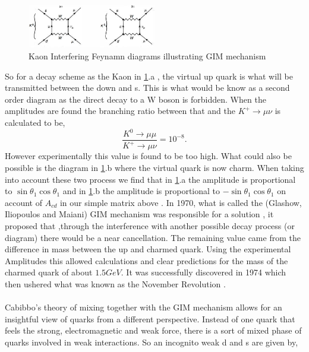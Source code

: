 \begin{figure}[h]
\centering
\includegraphics[width=0.5\textwidth]{figs/ckmfig3.jpg}
\caption{Kaon Interfering Feynamn diagrams illustrating GIM mechanism}
\label{fey2}
\end{figure}


So for a decay scheme as the Kaon in \cref{fey2}.a , the virtual up quark is what will be transmitted between the down and s. This is what would be know as a second order diagram as the direct decay to a W boson is forbidden. When the amplitudes are found the branching ratio between that and the $K^+\rightarrow\mu\nu$ is calculated to be,
\begin{equation}\label{mat3}
 \frac{K^0\rightarrow\mu\mu}{K^+\rightarrow\mu\nu}=10^{-8}.
\end{equation}
However experimentally this value is found to be too high. What could also be possible is the diagram in \cref{fey2}.b where the virtual quark is now charm. When taking into account these two process we find that in \cref{fey2}.a the amplitude is proportional to $\sin\theta_1 \cos\theta_1$ and in \cref{fey2}.b the amplitude is proportional to $-\sin\theta_1 \cos\theta_1$ on account of $A_{cd}$ in our simple matrix above \cite{CKM5}. 
In 1970, what is called the (Glashow, Iliopoulos and Maiani) GIM mechanism was responsible for a solution \cite{CKM9}, it proposed that ,through the interference with another possible decay process (or diagram) there would be a near cancellation. The remaining value came from the difference in mass between the up and charmed quark. Using the experimental Amplitudes this allowed calculations and clear predictions for the mass of the charmed quark of about $1.5GeV$. It was successfully discovered in 1974 which then ushered what was known as the November Revolution \cite{2}.
 \\
\\
Cabibbo's theory of mixing together with the GIM mechanism allows for an insightful view of quarks from a different perspective. Instead of one quark that feels the strong, electromagnetic and weak force, there is a sort of mixed phase of quarks involved in weak interactions. So an incognito weak d and s are given by,

